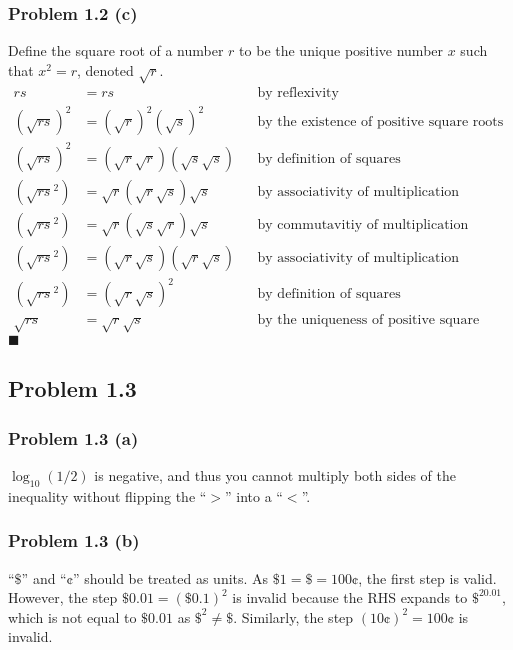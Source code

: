 \documentclass{article}
\begin{document}
\subsubsection{Problem 1.2 (c)}
Define the square root of a number $r$ to be the unique positive number $x$ such that $x^2=r$, denoted $\sqrt{r}$.
\begin{align}
  rs &= rs && \text{by reflexivity}\\
  (\sqrt{rs})^2 &= (\sqrt{r})^2(\sqrt{s})^2 && \text{by the existence of positive square roots}\\
  (\sqrt{rs})^2 &= (\sqrt{r}\sqrt{r})(\sqrt{s}\sqrt{s}) && \text{by definition of squares}\\
  (\sqrt{rs}^2) &= \sqrt{r}(\sqrt{r}\sqrt{s})\sqrt{s} && \text{by associativity of multiplication}\\
  (\sqrt{rs}^2) &= \sqrt{r}(\sqrt{s}\sqrt{r})\sqrt{s} && \text{by commutavitiy of multiplication}\\
  (\sqrt{rs}^2) &= (\sqrt{r}\sqrt{s})(\sqrt{r}\sqrt{s}) && \text{by associativity of multiplication}\\
  (\sqrt{rs}^2) &= (\sqrt{r}\sqrt{s})^2 && \text{by definition of squares}\\
  \sqrt{rs} &= \sqrt{r}\sqrt{s} && \text{by the uniqueness of positive square roots}
\end{align}
\hfill$\blacksquare$
\subsection{Problem 1.3}
\subsubsection{Problem 1.3 (a)}
$\log_{10}{(1/2)}$ is negative, and thus you cannot multiply both sides of the inequality without flipping the ``$>$'' into a ``$<$''.
\subsubsection{Problem 1.3 (b)}
``$\$$'' and ``¢'' should be treated as units. As $\$1=\$=100\text{¢}$, the first step is valid. However, the step $\$0.01 = (\$0.1)^2$ is invalid because the RHS expands to $\$^20.01$, which is not equal to $\$0.01$ as $\$^2\ne\$$. Similarly, the step $(10\text{¢})^2 = 100\text{¢}$ is invalid.
\end{document}
